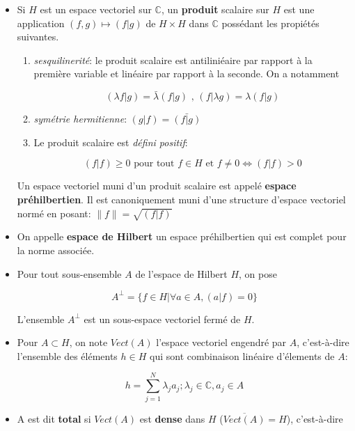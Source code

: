\documentclass[10pt,a4paper,oneside]{article}
\begin{document}
\begin{itemize}

\item
Si $H$ est un espace vectoriel sur $\mathbb{C}$, un \textbf{produit} scalaire sur $H$ est une application $(f,g) \mapsto (f|g)$ de $H \times H$ dans $\mathbb{C}$ possédant les propiétés suivantes.

\begin{enumerate}
\item
\textit{sesquilinerité}: le produit scalaire est antiliniéaire par rapport à la première variable et linéaire par rapport à la seconde. On a notamment

\[ (\lambda f | g ) = \bar{\lambda}(f | g) \text{ , } (f | \lambda g) = \lambda (f | g) \]

\item
\textit{symétrie hermitienne}: $(g | f) = \bar{(f | g)}$

\item
Le produit scalaire est \textit{défini positif}:

\[ (f | f) \geq 0 \text{ pour tout } f \in H \text{ et } f \neq 0 \Leftrightarrow (f | f) > 0 \]

\end{enumerate}

Un espace vectoriel muni d'un produit scalaire est appelé \textbf{espace préhilbertien}. Il est canoniquement muni d'une structure d'espace vectoriel normé en posant: $\| f \| = \sqrt{(f | f)}$

\item
On appelle \textbf{espace de Hilbert} un espace préhilbertien qui est complet pour la norme associée.

\item
Pour tout sous-ensemble $A$ de l'espace de Hilbert $H$, on pose

\[ A^\perp = \{ f \in H | \forall a \in A, (a | f) = 0 \} \]

L'ensemble $A^\perp$ est un sous-espace vectoriel fermé de $H$.

\item
Pour $A \subset H$, on note $Vect(A)$ l'espace vectoriel engendré par $A$, c'est-à-dire l'ensemble des éléments $h \in H$ qui sont combinaison linéaire d'élements de $A$:

\[ h = \sum_{j = 1}^N \lambda_j a_j; \lambda_j \in \mathbb{C}, a_j \in A \]

\item
A est dit \textbf{total} si $Vect(A)$ est \textbf{dense} dans $H$ ($\overline{Vect(A)} = H$), c'est-à-dire


\end{itemize}
\end{document}
